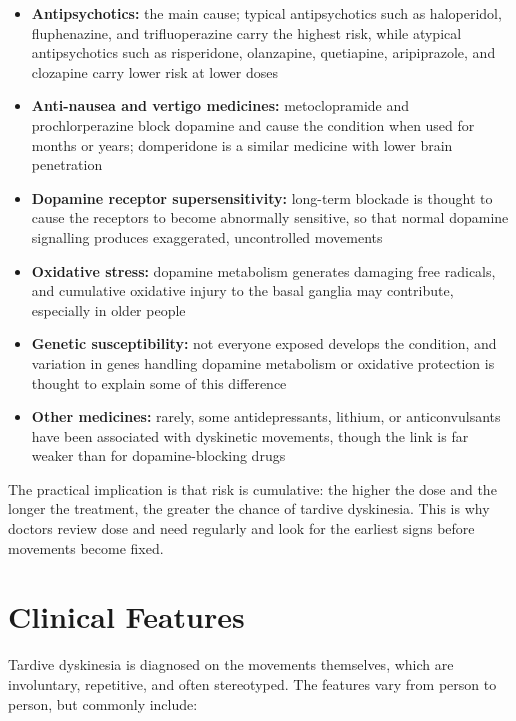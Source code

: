 \begin{itemize}
    \item \textbf{Antipsychotics:} the main cause; typical antipsychotics such as haloperidol, fluphenazine, and trifluoperazine carry the highest risk, while atypical antipsychotics such as risperidone, olanzapine, quetiapine, aripiprazole, and clozapine carry lower risk at lower doses
    \item \textbf{Anti-nausea and vertigo medicines:} metoclopramide and prochlorperazine block dopamine and cause the condition when used for months or years; domperidone is a similar medicine with lower brain penetration
    \item \textbf{Dopamine receptor supersensitivity:} long-term blockade is thought to cause the receptors to become abnormally sensitive, so that normal dopamine signalling produces exaggerated, uncontrolled movements
    \item \textbf{Oxidative stress:} dopamine metabolism generates damaging free radicals, and cumulative oxidative injury to the basal ganglia may contribute, especially in older people
    \item \textbf{Genetic susceptibility:} not everyone exposed develops the condition, and variation in genes handling dopamine metabolism or oxidative protection is thought to explain some of this difference
    \item \textbf{Other medicines:} rarely, some antidepressants, lithium, or anticonvulsants have been associated with dyskinetic movements, though the link is far weaker than for dopamine-blocking drugs
\end{itemize}

The practical implication is that risk is cumulative: the higher the dose and the longer the treatment, the greater the chance of tardive dyskinesia. This is why doctors review dose and need regularly and look for the earliest signs before movements become fixed.

\section*{Clinical Features}
Tardive dyskinesia is diagnosed on the movements themselves, which are involuntary, repetitive, and often stereotyped. The features vary from person to person, but commonly include:

